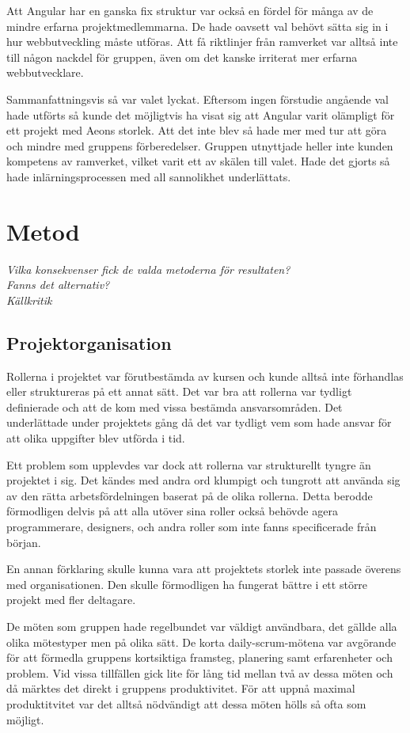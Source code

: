Att Angular har en ganska fix struktur var också en fördel för många av de mindre erfarna projektmedlemmarna. De hade oavsett val behövt sätta sig in i hur webbutveckling måste utföras. Att få riktlinjer från ramverket var alltså inte till någon nackdel för gruppen, även om det kanske irriterat mer erfarna webbutvecklare.

Sammanfattningsvis så var valet lyckat. Eftersom ingen förstudie angående val hade utförts så kunde det möjligtvis ha visat sig att Angular varit olämpligt för ett projekt med Aeons storlek. Att det inte blev så hade mer med tur att göra och mindre med gruppens förberedelser. Gruppen utnyttjade heller inte kunden kompetens av ramverket, vilket varit ett av skälen till valet. Hade det gjorts så hade inlärningsprocessen med all sannolikhet underlättats.  

\section{Metod}
\emph{Vilka konsekvenser fick de valda metoderna för resultaten?} \\
\emph{Fanns det alternativ?}\\
\emph{Källkritik}\\

\subsection{Projektorganisation}
Rollerna i projektet var förutbestämda av kursen och kunde alltså inte förhandlas eller struktureras på ett annat sätt. Det var bra att rollerna var tydligt definierade och att de kom med vissa bestämda ansvarsområden. Det underlättade under projektets gång då det var tydligt vem som hade ansvar för att olika uppgifter blev utförda i tid.

Ett problem som upplevdes var dock att rollerna var strukturellt tyngre än projektet i sig. Det kändes med andra ord klumpigt och tungrott att använda sig av den rätta arbetsfördelningen baserat på de olika rollerna. Detta berodde förmodligen delvis på att alla utöver sina roller också behövde agera programmerare, designers, och andra roller som inte fanns specificerade från början. 

En annan förklaring skulle kunna vara att projektets storlek inte passade överens med organisationen. Den skulle förmodligen ha fungerat bättre i ett större projekt med fler deltagare.

De möten som gruppen hade regelbundet var väldigt användbara, det gällde alla olika mötestyper men på olika sätt. De korta daily-scrum-mötena var avgörande för att förmedla gruppens kortsiktiga framsteg, planering samt erfarenheter och problem. Vid vissa tillfällen gick lite för lång tid mellan två av dessa möten och då märktes det direkt i gruppens produktivitet. För att uppnå maximal produktitvitet var det alltså nödvändigt att dessa möten hölls så ofta som möjligt.

